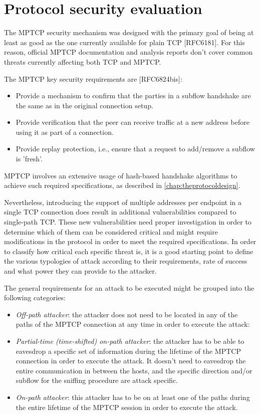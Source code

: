 \section{Protocol security evaluation}
The MPTCP security mechanism was designed with the primary goal of being at least as good as the one currently available for plain TCP [RFC6181]. For this reason, official MPTCP documentation and analysis reports don't cover common threats currently affecting both TCP and MPTCP.

The MPTCP key security requirements are [RFC6824bis]:
\begin{itemize} 
\item Provide a mechanism to confirm that the parties in a subflow handshake are the same as in the original connection setup.

\item Provide verification that the peer can receive traffic at a new address before using it as part of a connection.

\item Provide replay protection, i.e., ensure that a request to add/remove a subflow is 'fresh'.
\end{itemize}

MPTCP involves an extensive usage of hash-based handshake algorithms to achieve such required specifications, as described in \autoref{chap:theprotocoldesign}.

Nevertheless, introducing the support of multiple addresses per endpoint in a single TCP connection does result in additional vulnerabilities compared to single-path TCP. These new vulnerabilities need proper investigation in order to determine which of them can be considered critical and might require modifications in the protocol in order to meet the required specifications.
In order to classify how critical each specific threat is, it is a good starting point to define the various typologies of attack according to their requirements, rate of success and what power they can provide to the attacker.

The general requirements for an attack to be executed might be grouped into the following categories:

\begin{itemize}  
\item \textit{Off-path attacker}: the attacker does not need to be located in any of the paths of the MPTCP connection at any time in order to execute the attack:
\item \textit{Partial-time (time-shifted) on-path attacker}: the attacker has to be able to eavesdrop a specific set of information during the lifetime of the MPTCP connection in order to execute the attack. It doesn't need to eavesdrop the entire communication in between the hosts, and the specific direction and/or subflow for the sniffing procedure are attack specific.
\item \textit{On-path attacker}: this attacker has to be on at least one of the paths during the entire lifetime of the MPTCP session in order to execute the attack.
\end{itemize}

